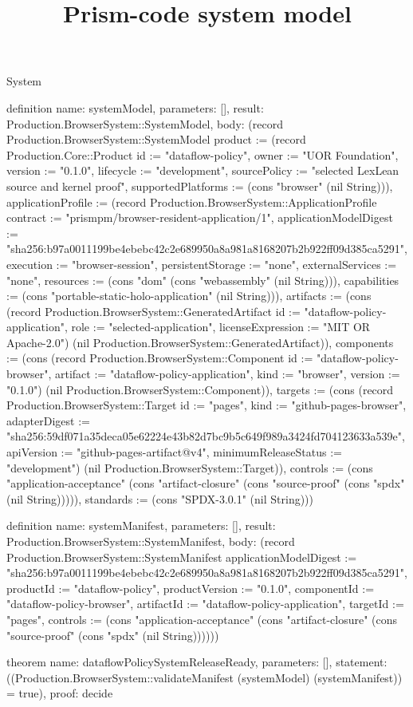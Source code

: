\begin{lexlean}{System}
\title{Prism-code system model}
\begin{semanticmodule}
definition{
  name: systemModel,
  parameters: [],
  result: Production.BrowserSystem::SystemModel,
  body: (record Production.BrowserSystem::SystemModel {product := (record Production.Core::Product {id := "dataflow-policy", owner := "UOR Foundation", version := "0.1.0", lifecycle := "development", sourcePolicy := "selected LexLean source and kernel proof", supportedPlatforms := (cons "browser" (nil String))}), applicationProfile := (record Production.BrowserSystem::ApplicationProfile {contract := "prismpm/browser-resident-application/1", applicationModelDigest := "sha256:b97a0011199be4ebebc42c2e689950a8a981a8168207b2b922ff09d385ca5291", execution := "browser-session", persistentStorage := "none", externalServices := "none", resources := (cons "dom" (cons "webassembly" (nil String))), capabilities := (cons "portable-static-holo-application" (nil String))}), artifacts := (cons (record Production.BrowserSystem::GeneratedArtifact {id := "dataflow-policy-application", role := "selected-application", licenseExpression := "MIT OR Apache-2.0"}) (nil Production.BrowserSystem::GeneratedArtifact)), components := (cons (record Production.BrowserSystem::Component {id := "dataflow-policy-browser", artifact := "dataflow-policy-application", kind := "browser", version := "0.1.0"}) (nil Production.BrowserSystem::Component)), targets := (cons (record Production.BrowserSystem::Target {id := "pages", kind := "github-pages-browser", adapterDigest := "sha256:59df071a35deca05e62224e43b82d7bc9b5c649f989a3424fd704123633a539e", apiVersion := "github-pages-artifact@v4", minimumReleaseStatus := "development"}) (nil Production.BrowserSystem::Target)), controls := (cons "application-acceptance" (cons "artifact-closure" (cons "source-proof" (cons "spdx" (nil String))))), standards := (cons "SPDX-3.0.1" (nil String))})
}

definition{
  name: systemManifest,
  parameters: [],
  result: Production.BrowserSystem::SystemManifest,
  body: (record Production.BrowserSystem::SystemManifest {applicationModelDigest := "sha256:b97a0011199be4ebebc42c2e689950a8a981a8168207b2b922ff09d385ca5291", productId := "dataflow-policy", productVersion := "0.1.0", componentId := "dataflow-policy-browser", artifactId := "dataflow-policy-application", targetId := "pages", controls := (cons "application-acceptance" (cons "artifact-closure" (cons "source-proof" (cons "spdx" (nil String)))))})
}

theorem{
  name: dataflowPolicySystemReleaseReady,
  parameters: [],
  statement: ((Production.BrowserSystem::validateManifest (systemModel) (systemManifest)) = true),
  proof: decide{}
}
\end{semanticmodule}
\end{lexlean}
